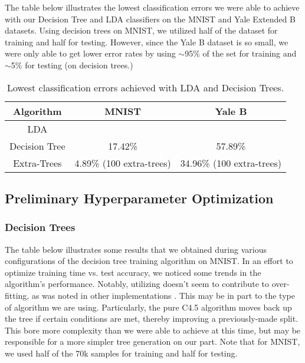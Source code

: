 \label{sec:results}
The table below illustrates the lowest classification errors we were able to achieve with our Decision Tree and LDA classifiers on the MNIST and Yale Extended B datasets. Using decision trees on MNIST, we utilized half of the dataset for training and half for testing. However, since the Yale B dataset is so small, we were only able to get lower error rates by using $\sim$95\% of the set for training and $\sim$5\% for testing (on decision trees.)

\begin{table}[H]
  \centering
  \begin{tabular}{||c | c | c||} 
    \hline
    Algorithm & MNIST & Yale B \\
    \hline\hline
    LDA &  &  \\ 
    \hline
    Decision Tree & 17.42\% & 57.89\% \\ 
    \hline
    Extra-Trees & 4.89\% (100 extra-trees) & 34.96\% (100 extra-trees) \\
    \hline
  \end{tabular}
  \caption{Lowest classification errors achieved with LDA and Decision Trees.}
\end{table}

\subsection{Preliminary Hyperparameter Optimization}

\subsubsection{Decision Trees}

The table below illustrates some results that we obtained during various configurations of the decision tree training algorithm on MNIST. In an effort to optimize training time vs. test accuracy, we noticed some trends in the algorithm's performance. Notably, utilizing  doesn't seem to contribute to over-fitting, as was noted in other implementations \cite{matlab:fitctree}. This may be in part to the type of algorithm we are using. Particularly, the pure C4.5 algorithm moves back up the tree if certain conditions are met, thereby improving a previously-made split. This bore more complexity than we were able to achieve at this time, but may be responsible for a more simpler tree generation on our part. Note that for MNIST, we used half of the 70k samples for training and half for testing.

